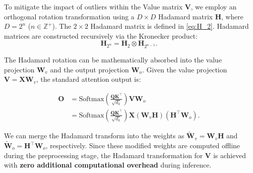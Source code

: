 To mitigate the impact of outliers within the Value matrix $\mathbf{V}$, we employ an orthogonal rotation transformation using a $D \times D$ Hadamard matrix $\mathbf{H}$, where $D = 2^n$ ($n \in \mathbb{Z}^+$). The $2 \times 2$ Hadamard matrix is defined in \cref{eq:H_2}. Hadamard matrices are constructed recursively via the Kronecker product:
\begin{equation}
\mathbf{H}_{2^{n}} = \mathbf{H}_{2} \otimes \mathbf{H}_{2^{n-1}}.
\end{equation}


The Hadamard rotation can be mathematically absorbed into the value projection $\mathbf{W}_v$ and the output projection $\mathbf{W}_o$. Given the value projection $\mathbf{V} = \mathbf{X}\mathbf{W}_v$, the standard attention output is:


\begin{align}
\mathbf{O} &= \text{Softmax}\left(\frac{\mathbf{Q}\mathbf{K}^\top}{\sqrt{d_k}}\right) \mathbf{V} \mathbf{W}_o \nonumber \\
 &= \text{Softmax}\left(\frac{\mathbf{Q}\mathbf{K}^\top}{\sqrt{d_k}}\right) \mathbf{X} (\mathbf{W}_v \mathbf{H}) (\mathbf{H}^\top \mathbf{W}_o).
\end{align}

\newpage


We can merge the Hadamard transform into the weights as $\widetilde{\mathbf{W}}_v=\mathbf{W}_v\mathbf{H}$ and $\widetilde{\mathbf{W}}_o=\mathbf{H}^{\top}\mathbf{W}_o$, respectively. Since these modified weights are computed offline during the preprocessing stage, the Hadamard transformation for $\mathbf{V}$ is achieved with \textbf{zero additional computational overhead} during inference.



